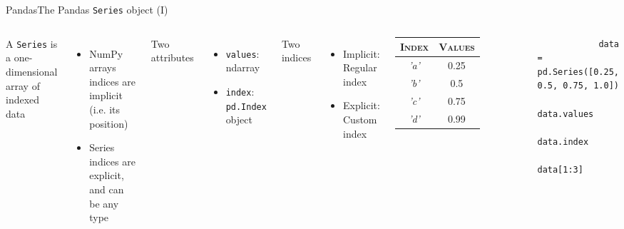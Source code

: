\documentclass[10pt,compress]{beamer} %
\begin{document}
\begin{frame}[fragile]{Pandas}{The Pandas \texttt{Series} object (I)}
	\begin{columns}

		A \texttt{Series} is a one-dimensional array of indexed data
		\begin{itemize}
			\item NumPy arrays indices are implicit (i.e. its position)
			\item Series indices are explicit, and can be any type
		\end{itemize}
		Two attributes
		\begin{itemize}
			\item \texttt{values}: ndarray
			\item \texttt{index}: \texttt{pd.Index} object
		\end{itemize}
		Two indices
		\begin{itemize}
			\item Implicit: Regular index
			\item Explicit: Custom index
		\end{itemize}

	   \centering
      	\begin{tabularx}{2.7cm}{|c|c|}
			\hline
       		\textsc{Index} &  \textsc{Values}\\ \hline
       		\textit{'a'} & 0.25 \\
       		\textit{'b'} & 0.5  \\
       		\textit{'c'} & 0.75 \\
       		\textit{'d'} & 0.99 \\\hline
    	\end{tabularx}

		\bigskip

		\begin{exampleblock}{}
		\vspace{-0.2cm} 
			\begin{lstlisting}
			data = pd.Series([0.25, 0.5, 0.75, 1.0])
			data.values
			data.index
			data[1:3]
			\end{lstlisting}
		\vspace{-0.2cm} 
		\end{exampleblock}
	\end{columns}
\end{frame}
\end{document}
